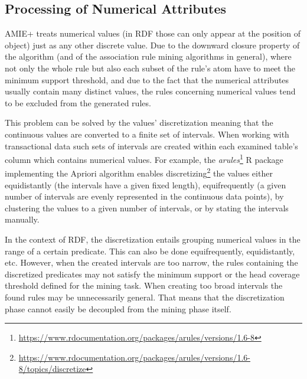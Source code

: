 

\subsection{Processing of Numerical Attributes\label{numericalattributes}}

AMIE+ treats numerical values (in RDF those can only appear at the position of object) just as any other discrete value. Due to the downward closure property of the algorithm (and of the association rule mining algorithms in general), where not only the whole rule but also each subset of the rule's atom have to meet the minimum support threshold, and due to the fact that the numerical attributes usually contain many distinct values, the rules concerning numerical values tend to be excluded from the generated rules.

This problem can be solved by the values' discretization meaning that the continuous values are converted to a finite set of intervals. When working with transactional data such sets of intervals are created within each examined table's column which contains numerical values. For example, the \textit{arules}\footnote{\href{https://www.rdocumentation.org/packages/arules/versions/1.6-8}{https://www.rdocumentation.org/packages/arules/versions/1.6-8}} R package implementing the Apriori algorithm enables discretizing\footnote{\href{https://www.rdocumentation.org/packages/arules/versions/1.6-8/topics/discretize}{https://www.rdocumentation.org/packages/arules/versions/1.6-8/topics/discretize}} the values either equidistantly (the intervals have a given fixed length), equifrequently (a given number of intervals are evenly represented in the continuous data points), by clustering the values to a given number of intervals, or by stating the intervals manually.

In the context of RDF, the discretization entails grouping numerical values in the range of a certain predicate. This can also be done equifrequently, equidistantly, etc. However, when the created intervals are too narrow, the rules containing the discretized predicates may not satisfy the minimum support or the head coverage threshold defined for the mining task. When creating too broad intervals the found rules may be unnecessarily general. That means that the discretization phase cannot easily be decoupled from the mining phase itself.

